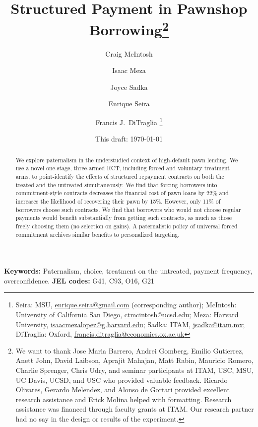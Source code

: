 \documentclass[12pt, a4paper]{article}
\begin{document}
\title{Structured Payment in Pawnshop Borrowing\thanks{We want to thank Jose Maria Barrero, Andrei Gomberg, Emilio Gutierrez, Anett John, David Laibson, Aprajit Mahajan, Matt Rabin, Mauricio Romero, Charlie Sprenger, Chris Udry, and seminar participants at ITAM, USC, MSU, UC Davis,  UCSD, and USC who provided valuable feedback. Ricardo Olivares, Gerardo Melendez, and Alonso de Gortari provided excellent research assistance and Erick Molina helped with formatting.  Research assistance was financed through faculty grants at ITAM. Our research partner had no say in the design or results of the experiment.}}
\author{Craig McIntosh \and Isaac Meza \and Joyce Sadka \and Enrique Seira \and Francis J.\ DiTraglia   \thanks{Seira:  MSU, \url{enrique.seira@gmail.com} (corresponding author); McIntosh:  University of California San Diego, \url{ctmcintosh@ucsd.edu}; Meza: Harvard University, \url{isaacmezalopez@g.harvard.edu}; Sadka: ITAM, \url{jsadka@itam.mx}; DiTraglia: Oxford, \url{francis.ditraglia@economics.ox.ac.uk}} }
\date{This draft:  \today \\[2 cm]}



\maketitle
\vspace{-0.75in}

\begin{abstract}
We explore paternalism in the understudied context of high-default pawn lending. We use a novel one-stage, three-armed RCT, including forced and voluntary treatment arms, to point-identify the effects of structured repayment contracts on both the treated and the untreated simultaneously. We find that forcing borrowers into commitment-style contracts decreases the financial cost of pawn loans by 22\% and increases the likelihood of recovering their pawn by 15\%. However, only 11\% of borrowers choose such contracts. We find that borrowers who would not choose regular payments would benefit substantially from getting such contracts, as much as those freely choosing them (no selection on gains).  A paternalistic policy of universal forced commitment archives similar benefits to personalized targeting. 
\end{abstract}


\vspace{.8in}
\noindent \textbf{Keywords: } Paternalism, choice, treatment on the untreated, payment frequency, overconfidence. \textbf{JEL codes:} G41, C93, O16, G21
\end{document}

